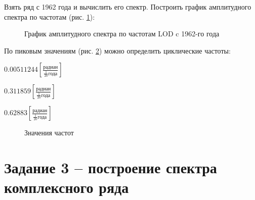 \documentclass[a4paper,oneside,14pt]{extreport}
\begin{document}
Взять ряд с 1962 года  и вычислить его спектр. Построить график амплитудного спектра по частотам (рис. \ref{task2_g3}):

\begin{figure}[h]
	\caption{График амплитудного спектра по частотам LOD c 1962-го года}
	\label{task2_g3}
\end{figure}

\newpage
По пиковым значениям (рис. \ref{task2_freq_vals}) можно определить циклические частоты: 

$0.00511244 [\frac{\text{радиан}}{\frac{1}{20}\text{года}}]$

$0.311859 [\frac{\text{радиан}}{\frac{1}{20}\text{года}}]$

$0.62883 [\frac{\text{радиан}}{\frac{1}{20}\text{года}}]$

%
%
%

\begin{figure}[h]
	\caption{Значения частот}
	\label{task2_freq_vals}
\end{figure}

\section*{Задание 3 – построение спектра комплексного ряда}
\end{document}
